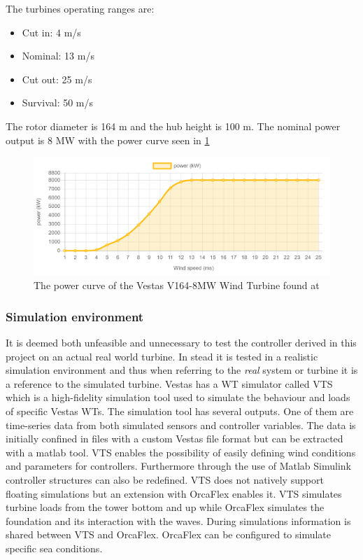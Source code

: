 The turbines operating ranges are:
\begin{itemize}
	\item Cut in: 4 m/s
	\item Nominal: 13 m/s
	\item Cut out: 25 m/s
	\item Survival: 50 m/s
\end{itemize}
The rotor diameter is 164 m and the hub height is 100 m. The nominal power output is 8 MW with the power curve seen in \cref{fig:v164_8mw_pc}
\begin{figure}[ht]
	\centering
	\includegraphics[width=0.95\linewidth]{Graphics/v164-8mw_powerCurve.PNG}
	\caption{The power curve of the Vestas V164-8MW Wind Turbine found at \cite{LucasBauer}}
	\label{fig:v164_8mw_pc}
\end{figure}

\subsubsection{Simulation environment}
It is deemed both unfeasible and unnecessary to test the controller derived in this project on an actual real world turbine. In stead it is tested in a realistic simulation environment and thus when referring to the \textit{real} system or turbine it is a reference to the simulated turbine. Vestas has a WT simulator called VTS which is a high-fidelity simulation tool used to simulate the behaviour and loads of specific Vestas WTs. The simulation tool has several outputs. One of them are time-series data from both simulated sensors and controller variables. The data is initially confined in files with a custom Vestas file format but can be extracted with a matlab tool. VTS enables the possibility of easily defining wind conditions and parameters for controllers. Furthermore through the use of Matlab Simulink controller structures can also be redefined. VTS does not natively support floating simulations but an extension with OrcaFlex enables it. VTS simulates turbine loads from the tower bottom and up while OrcaFlex simulates the foundation and its interaction with the waves. During simulations information is shared between VTS and OrcaFlex. OrcaFlex can be configured to simulate specific sea conditions.

